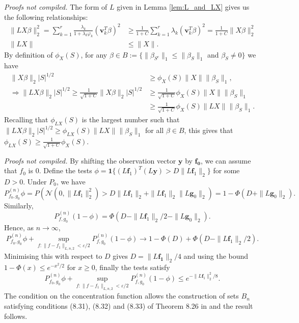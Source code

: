 \documentclass[11pt]{article}
\renewenvironment{proof}[1]{\par\noindent{\bf #1 \ }}{\hfill\BlackBox\\[2mm]}
\renewenvironment{proof}[1]{\textit{Proofs not compiled.}}{}
\newcommand{\eps}{\varepsilon}
\begin{document}
\begin{proof}{Proof of Lemma \ref{lem:compatibility_relation}}
The form of $L$ given in Lemma \ref{lem:L_and_LX} gives us the following relationships:
	\begin{align*}
	\|LX \beta\|_2^2 = \sum_{k=1}^r \frac{\lambda_k}{1+\lambda_k \varphi_k} (\mathbf{v}_k^T \beta)^2  &\geq \frac{1}{1+C} \sum _{k = 1}^r \lambda_k (\mathbf{v}_k^T \beta)^2 = \frac{1}{1+C} \|X\beta\|_2^2		\\
	\|LX\| &\leq \|X\|.
	\end{align*}
	By definition of $\phi_X(S)$, for any $\beta \in B:= \{\|\beta_{S^c}\|_1 \leq \|\beta_S\|_1$ and $\beta_S \neq 0\}$ we have
	\begin{align*}
	\|X \beta \|_2 |S|^{1/2} &\geq \phi_X(S) \|X\| \|\beta_S\|_1,		\\
	\Rightarrow \|L X \beta \|_2 |S|^{1/2} \geq \frac{1}{\sqrt{1+C}} \|X \beta \|_2 |S|^{1/2} &\geq \frac{1}{\sqrt{1+C}} \phi_X(S) \|X\| \|\beta_S\|_1 \\
	&\geq \frac{1}{\sqrt{1+C}} \phi_X(S) \|LX\| \|\beta_S\|_1.
	\end{align*}
	Recalling that $\phi_{LX}(S)$ is the largest number such that $\|LX \beta \|_2 |S|^{1/2} \geq \phi_{LX}(S)\|LX\|\|\beta_S\|_1$ for all $\beta \in B$, this gives that $\phi_{LX}(S) \geq \frac{1}{\sqrt{1+C}} \phi_X(S)$.
\end{proof}

\begin{proof}{Proof of Theorem \ref{thm:gp_contraction}}
By shifting the observation vector $\mathbf{y}$ by $\mathbf{f_0}$, we can assume that $f_0$ is 0.
Define the tests $\phi = \mathbf{1}\{(L\mathbf{f}_1)^T (L\mathbf{y}) > D\|L\mathbf{f}_1\|_2\}$ for some $D > 0$. Under $P_{0}$, we have
$$
P^{(n)}_{f_0, g_0} \phi = P( \mathcal{N}(0, \|L\mathbf{f}_1\|_2^2) > D\|L \mathbf{f}_1 \|_2 + \|L \mathbf{f}_1 \|_2 \|L \mathbf{g}_0\|_2) = 1 - \Phi(D + \|L\mathbf{g}_0\|_2).
$$
Similarly, 
$$
P^{(n)}_{f, g_0} (1-\phi) = \Phi(D - \|L\mathbf{f}_1\|_2/2 - \|L\mathbf{g}_0\|_2).
$$
Hence, as $n \rightarrow \infty$,
$$
P^{(n)}_{f_0, g_0} \phi + \sup_{f : \|f - f_1\|_{L, n, 2} < \eps/2} P^{(n)}_{f, g_0} (1-\phi)  \rightarrow 1 - \Phi(D) + \Phi(D - \|L \mathbf{f}_1\|_2/2).
$$
Minimising this with respect to $D$ gives $D = \|L \mathbf{f_1}\|_2/4$ and using the bound $1 - \Phi(x) \leq e^{-x^2/2}$ for $x \geq 0$, finally the tests satisfy
$$
P^{(n)}_{f_0, g_0} \phi + \sup_{f : \|f - f_1\|_{L, n, 2} < \eps/2} P^{(n)}_{f, g_0} (1-\phi) \leq e^{-\|L\mathbf{f}_1\|_2^2/8}.
$$
The condition on the concentration function allows the construction of sets $B_n$ satisfying conditions (8.31), (8.32) and (8.33) of Theorem 8.26 in \cite{FNBI} and the result follows.
\end{proof}
\end{document}
